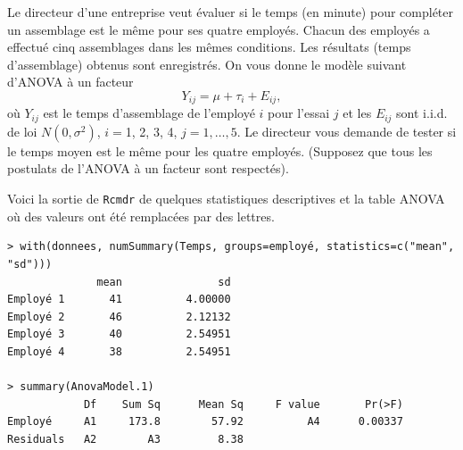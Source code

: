 \begin{questions}
\question\label{anova1Fact} 
Le directeur d'une entreprise veut évaluer si le temps (en minute) pour compléter un assemblage est le même pour ses quatre employés. Chacun des employés a effectué cinq assemblages dans les mêmes conditions. Les résultats (temps d'assemblage) obtenus sont enregistrés. 
On vous donne le modèle suivant d'ANOVA à un facteur
$$Y_{ij}=\mu+\tau_i+E_{ij},$$
où $Y_{ij}$ est le temps d'assemblage de l'employé $i$ pour l'essai $j$ et
les $E_{ij}$ sont i.i.d. de loi $N(0,\sigma^2)$, $i=$1, 2, 3, 4,
$j=1,\ldots,5$. 
Le directeur vous demande de tester si le temps moyen est le même pour les quatre employés.
(Supposez que tous les postulats de l'ANOVA à un facteur sont respectés).\medskip


Voici la sortie de \texttt{Rcmdr} de quelques statistiques descriptives et la table ANOVA où des valeurs ont été remplacées par des lettres.


\begin{verbatim} 
> with(donnees, numSummary(Temps, groups=employé, statistics=c("mean", "sd")))
              mean               sd
Employé 1       41          4.00000
Employé 2       46          2.12132
Employé 3       40          2.54951
Employé 4       38          2.54951

> summary(AnovaModel.1)
            Df    Sum Sq      Mean Sq     F value       Pr(>F)
Employé     A1     173.8        57.92          A4      0.00337
Residuals   A2        A3         8.38
\end{verbatim}

\end{questions}
